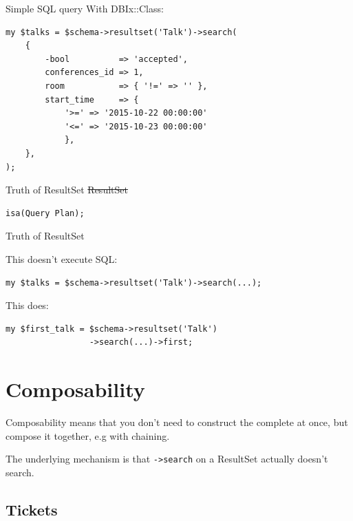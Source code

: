 \begin{frame}[fragile]{Simple SQL query}
With DBIx::Class:
\begin{lstlisting}
my $talks = $schema->resultset('Talk')->search(
    {
        -bool          => 'accepted',
        conferences_id => 1,
        room           => { '!=' => '' },
        start_time     => {
            '>=' => '2015-10-22 00:00:00'
            '<=' => '2015-10-23 00:00:00'
            },
    },
);
\end{lstlisting}
\end{frame}


\begin{frame}[fragile]{Truth of ResultSet}
\sout{ResultSet}

\begin{lstlisting}
isa(Query Plan);
\end{lstlisting}

\end{frame}

\begin{frame}[fragile]{Truth of ResultSet}

This doesn't execute SQL:

\begin{lstlisting}
my $talks = $schema->resultset('Talk')->search(...);
\end{lstlisting}

This does:

\begin{lstlisting}
my $first_talk = $schema->resultset('Talk')
                 ->search(...)->first;
\end{lstlisting}

\end{frame}

\section{Composability}

Composability means that you don't need to construct the
complete at once, but compose it together, e.g with
chaining.

The underlying mechanism is that \verb|->search| on a
ResultSet actually doesn't search.

\subsection{Tickets}


